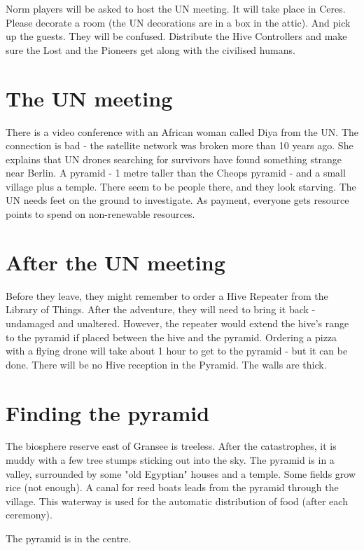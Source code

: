 Norm players will be asked to host the UN meeting. It will take place in Ceres. Please decorate a room (the UN decorations are in a box in the attic). And pick up the guests. They will be confused. Distribute the Hive Controllers and make sure the Lost and the Pioneers get along with the civilised humans.


\section{The UN meeting}

There is a video conference with an African woman called Diya from the UN. The connection is bad - the satellite network was broken more than 10 years ago. She explains that UN drones searching for survivors have found something strange near Berlin. A pyramid - 1 metre taller than the Cheops pyramid - and a small village plus a temple. There seem to be people there, and they look starving. The UN needs feet on the ground to investigate. As payment, everyone gets resource points to spend on non-renewable resources.

\section{After the UN meeting}

Before they leave, they might remember to order a Hive Repeater from the Library of Things. After the adventure, they will need to bring it back - undamaged and unaltered. However, the repeater would extend the hive's range to the pyramid if placed between the hive and the pyramid. Ordering a pizza with a flying drone will take about 1 hour to get to the pyramid - but it can be done. There will be no Hive reception in the Pyramid. The walls are thick.

\section{Finding the pyramid}

The biosphere reserve east of Gransee is treeless. After the catastrophes, it is muddy with a few tree stumps sticking out into the sky. The pyramid is in a valley, surrounded by some "old Egyptian" houses and a temple. Some fields grow rice (not enough). A canal for reed boats leads from the pyramid through the village. This waterway is used for the automatic distribution of food (after each ceremony).

The pyramid is in the centre.

